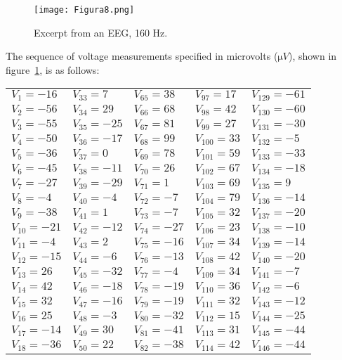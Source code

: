 \documentclass[11pt]{rMTA2010} \usepackage[utf8]{inputenc} \usepackage{graphicx} \usepackage{booktabs} \usepackage{array} \usepackage{enumerate}
\begin{document}
\begin{figure}[H]
\centering
\texttt{[image: Figura8.png]}
\caption{Excerpt from an EEG, 160 Hz.}
\label{f8}
\end{figure}

The sequence of voltage measurements specified in microvolts ($\mathrm{\mu}V$), shown in figure~\ref{f8},  is as follows:

\vspace{4mm}

\begin{tabular}{ l l l l l }
$V_{1}=-16$ & $V_{33}=7$ & $V_{65}=38$ & $V_{97}=17$ & $V_{129}=-61$ \\
$V_{2}=-56$ & $V_{34}=29$ & $V_{66}=68$ & $V_{98}=42$ & $V_{130}=-60$ \\
$V_{3}=-55$ & $V_{35}=-25$ & $V_{67}=81$ & $V_{99}=27$ & $V_{131}=-30$ \\
$V_{4}=-50$ & $V_{36}=-17$ & $V_{68}=99$ & $V_{100}=33$ & $V_{132}=-5$ \\
$V_{5}=-36$ & $V_{37}=0$ & $V_{69}=78$ & $V_{101}=59$ & $V_{133}=-33$ \\
$V_{6}=-45$ & $V_{38}=-11$ & $V_{70}=26$ & $V_{102}=67$ & $V_{134}=-18$ \\
$V_{7}=-27$ & $V_{39}=-29$ & $V_{71}=1$ & $V_{103}=69$ & $V_{135}=9$ \\
$V_{8}=-4$ & $V_{40}=-4$ & $V_{72}=-7$ & $V_{104}=79$ & $V_{136}=-14$ \\
$V_{9}=-38$ & $V_{41}=1$ & $V_{73}=-7$ & $V_{105}=32$ & $V_{137}=-20$ \\
$V_{10}=-21$ & $V_{42}=-12$ & $V_{74}=-27$ & $V_{106}=23$ & $V_{138}=-10$ \\
$V_{11}=-4$ & $V_{43}=2$ & $V_{75}=-16$ & $V_{107}=34$ & $V_{139}=-14$ \\
$V_{12}=-15$ & $V_{44}=-6$ & $V_{76}=-13$ & $V_{108}=42$ & $V_{140}=-20$ \\
$V_{13}=26$ & $V_{45}=-32$ & $V_{77}=-4$ & $V_{109}=34$ & $V_{141}=-7$ \\
$V_{14}=42$ & $V_{46}=-18$ & $V_{78}=-19$ & $V_{110}=36$ & $V_{142}=-6$ \\
$V_{15}=32$ & $V_{47}=-16$ & $V_{79}=-19$ & $V_{111}=32$ & $V_{143}=-12$ \\
$V_{16}=25$ & $V_{48}=-3$ & $V_{80}=-32$ & $V_{112}=15$ & $V_{144}=-25$ \\
$V_{17}=-14$ & $V_{49}=30$ & $V_{81}=-41$ & $V_{113}=31$ & $V_{145}=-44$ \\
$V_{18}=-36$ & $V_{50}=22$ & $V_{82}=-38$ & $V_{114}=42$ & $V_{146}=-44$ \\

\end{tabular}
\end{document}
